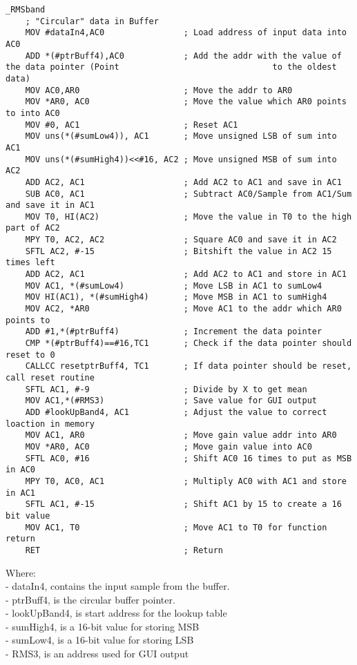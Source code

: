 \begin{lstlisting}[language={[x86masm]Assembler}, caption = {Compressor Algorithm},label={listingCompressorMain}]
_RMSband
	; "Circular" data in Buffer
	MOV #dataIn4,AC0				; Load address of input data into AC0
	ADD *(#ptrBuff4),AC0			; Add the addr with the value of the data pointer (Point 					 	       to the oldest data)
	MOV AC0,AR0						; Move the addr to AR0
	MOV *AR0, AC0					; Move the value which AR0 points to into AC0
	MOV #0, AC1						; Reset AC1
	MOV uns(*(#sumLow4)), AC1       ; Move unsigned LSB of sum into AC1
	MOV uns(*(#sumHigh4))<<#16, AC2 ; Move unsigned MSB of sum into AC2
	ADD AC2, AC1					; Add AC2 to AC1 and save in AC1
	SUB AC0, AC1					; Subtract AC0/Sample from AC1/Sum and save it in AC1	 
	MOV T0, HI(AC2)					; Move the value in T0 to the high part of AC2
	MPY T0, AC2, AC2				; Square AC0 and save it in AC2
	SFTL AC2, #-15					; Bitshift the value in AC2 15 times left 
	ADD AC2, AC1					; Add AC2 to AC1 and store in AC1
	MOV AC1, *(#sumLow4)			; Move LSB in AC1 to sumLow4
	MOV HI(AC1), *(#sumHigh4)		; Move MSB in AC1 to sumHigh4
	MOV AC2, *AR0					; Move AC1 to the addr which AR0 points to
	ADD #1,*(#ptrBuff4)				; Increment the data pointer
	CMP *(#ptrBuff4)==#16,TC1		; Check if the data pointer should reset to 0
	CALLCC resetptrBuff4, TC1		; If data pointer should be reset, call reset routine
	SFTL AC1, #-9					; Divide by X to get mean
	MOV AC1,*(#RMS3)				; Save value for GUI output
	ADD #lookUpBand4, AC1			; Adjust the value to correct loaction in memory
	MOV AC1, AR0					; Move gain value addr into AR0
	MOV *AR0, AC0					; Move gain value into AC0
	SFTL AC0, #16					; Shift AC0 16 times to put as MSB in AC0
	MPY T0, AC0, AC1				; Multiply AC0 with AC1 and store in AC1 
	SFTL AC1, #-15					; Shift AC1 by 15 to create a 16 bit value
	MOV AC1, T0						; Move AC1 to T0 for function return
	RET								; Return
\end{lstlisting}

Where: \\
- dataIn4, contains the input sample from the buffer. \\
- ptrBuff4, is the circular buffer pointer. \\
- lookUpBand4, is start address for the lookup table\\
- sumHigh4, is a 16-bit value for storing MSB \\
- sumLow4, is a 16-bit value for storing LSB \\
- RMS3, is an address used for GUI output \\

